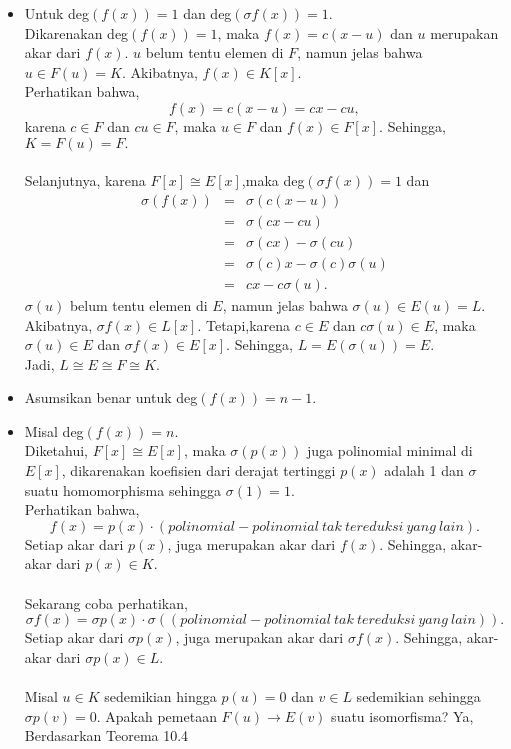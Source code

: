 	\begin{itemize}
	\item Untuk deg$(f(x))=1$ dan deg$(\sigma f(x))=1.$
\\	Dikarenakan deg$(f(x))=1$, maka $f(x)=c(x-u)$ dan $u$ merupakan akar dari $f(x)$. $u$ belum tentu elemen di $F$, namun jelas bahwa $u\in F(u)=K.$ Akibatnya, $f(x)\in K[x].$
\\	Perhatikan bahwa, $$f(x)=c(x-u)=cx-cu,$$
	karena $c\in F$ dan $cu\in F$, maka $u\in F$ dan $f(x) \in F[x].$ Sehingga, $K=F(u)=F.$
\\ \\	Selanjutnya, karena $F[x] \cong E[x]$,maka deg$(\sigma f(x))=1$ dan  
	$$\begin{array}{rcl}
	\sigma(f(x))&=&\sigma(c(x-u))\\
	&=&\sigma(cx-cu)\\
	&=&\sigma(cx)-\sigma(cu)\\
	&=&\sigma(c)x-\sigma(c)\sigma(u)\\
	&=&cx-c\sigma(u).
	\end{array}$$
	$\sigma(u)$ belum tentu elemen di $E$, namun jelas bahwa $\sigma(u)\in E(u)=L.$ Akibatnya, $\sigma f(x)\in L[x].$
	Tetapi,karena $c\in E$ dan $c\sigma(u)\in E$, maka $\sigma(u)\in E$ dan $\sigma f(x) \in E[x].$ Sehingga, $L=E(\sigma(u))=E.$
\\	Jadi, $L\cong E \cong F \cong K.$
	\item Asumsikan benar untuk deg$(f(x))=n-1.$
	\item Misal deg$(f(x))=n$.
\\	Diketahui, $F[x] \cong E[x]$, maka $\sigma(p(x))$ juga polinomial minimal di $E[x]$, dikarenakan koefisien dari derajat tertinggi $p(x)$ adalah 1 dan $\sigma$ suatu homomorphisma sehingga $\sigma(1)=1$.
\\	Perhatikan bahwa,
	$$f(x)=p(x)\cdot (polinomial-polinomial~tak~tereduksi~yang~lain).$$
	Setiap akar dari $p(x)$, juga merupakan akar dari $f(x)$. Sehingga, akar-akar dari $p(x)\in K.$
\\ \\	Sekarang coba perhatikan,
	$$\sigma f(x)=\sigma p(x)\cdot \sigma((polinomial-polinomial~tak~tereduksi~yang~lain)).$$
	Setiap akar dari $\sigma p(x)$, juga merupakan akar dari $\sigma f(x)$. Sehingga, akar-akar dari $\sigma p(x)\in L.$
\\ \\	Misal $u\in K$ sedemikian hingga $p(u)=0$ dan $v\in L$ sedemikian sehingga $\sigma p(v)=0$. Apakah pemetaan $F(u)\longrightarrow E(v)$ suatu isomorfisma? Ya, Berdasarkan Teorema 10.4

\end{itemize}
